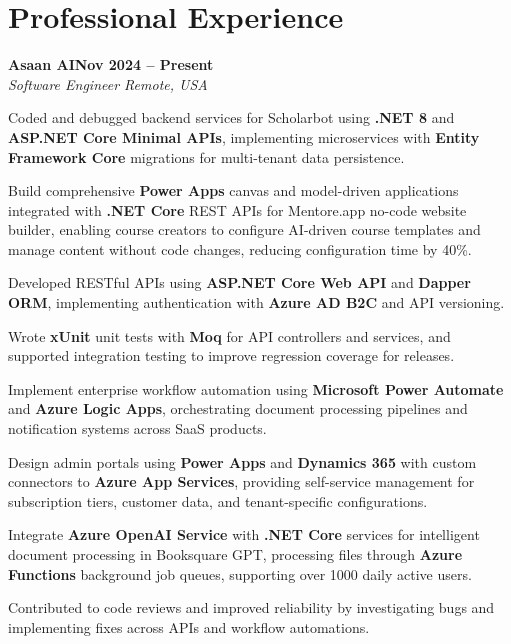 \documentclass[letterpaper,10pt]{article}
\newcommand{\headingBf}[2]{
  \hspace{10pt}\textbf{#1}\hfill\textbf{#2}\\
}
\newcommand{\headingIt}[2]{
  \hspace{10pt}\textit{#1}\hfill\textit{#2}\\
}
\newenvironment{resume_list}{
  \vspace{-7pt}
  \begin{itemize}[itemsep=-2px, parsep=1pt, leftmargin=30pt]
}{
  \end{itemize}
}
\begin{document}
\section{Professional Experience}

\headingBf{Asaan AI}{Nov 2024 -- Present}
\headingIt{Software Engineer \hfill Remote, USA}{}
\begin{resume_list}
    \item Coded and debugged backend services for Scholarbot using \textbf{.NET 8} and \textbf{ASP.NET Core Minimal APIs}, implementing microservices with \textbf{Entity Framework Core} migrations for multi-tenant data persistence.
    \item Build comprehensive \textbf{Power Apps} canvas and model-driven applications integrated with \textbf{.NET Core} REST APIs for Mentore.app no-code website builder, enabling course creators to configure AI-driven course templates and manage content without code changes, reducing configuration time by 40\%.
    \item Developed RESTful APIs using \textbf{ASP.NET Core Web API} and \textbf{Dapper ORM}, implementing authentication with \textbf{Azure AD B2C} and API versioning.
    \item Wrote \textbf{xUnit} unit tests with \textbf{Moq} for API controllers and services, and supported integration testing to improve regression coverage for releases.
    \item Implement enterprise workflow automation using \textbf{Microsoft Power Automate} and \textbf{Azure Logic Apps}, orchestrating document processing pipelines and notification systems across SaaS products.
    \item Design admin portals using \textbf{Power Apps} and \textbf{Dynamics 365} with custom connectors to \textbf{Azure App Services}, providing self-service management for subscription tiers, customer data, and tenant-specific configurations.
    \item Integrate \textbf{Azure OpenAI Service} with \textbf{.NET Core} services for intelligent document processing in Booksquare GPT, processing files through \textbf{Azure Functions} background job queues, supporting over 1000 daily active users.
    \item Contributed to code reviews and improved reliability by investigating bugs and implementing fixes across APIs and workflow automations.
\end{resume_list}
\end{document}
